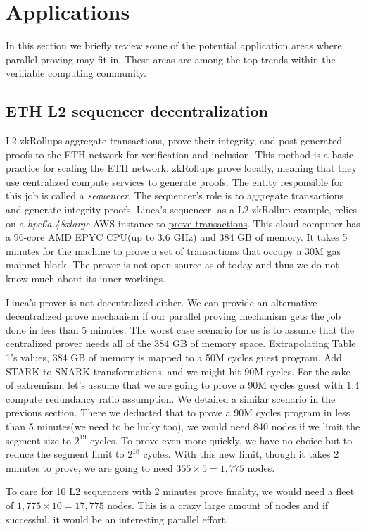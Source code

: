 \documentclass[a4paper, 10pt]{article}
\begin{document}
\section{Applications}
In this section we briefly review some of the potential application areas where parallel proving may fit in. These areas are among the top trends within the verifiable computing community.

\subsection{ETH L2 sequencer decentralization}
L2 zkRollups aggregate transactions, prove their integrity, and post generated proofs to the ETH network for verification and inclusion. This method is a basic practice for scaling the ETH network. zkRollups prove locally, meaning that they use centralized compute services to generate proofs. The entity responsible for this job is called a \textit{sequencer}. The sequencer's role is to aggregate transactions and generate integrity proofs. Linea's sequencer, as a L2 zkRollup example, relies on a \textit{hpc6a.48xlarge} AWS instance to \href{https://ethresear.ch/t/vortex-building-a-prover-for-the-zk-evm/14427}{prove transactions}. This cloud computer has a 96-core AMD EPYC CPU(up to 3.6 GHz) and 384 GB of memory. It takes \underline{5 minutes} for the machine to prove a set of transactions that occupy a 30M gas mainnet block. The prover is not open-source as of today and thus we do not know much about its inner workings.
\par
Linea's prover is not decentralized either. We can provide an alternative decentralized prove mechanism if our parallel proving mechanism gets the job done in less than 5 minutes. The worst case scenario for us is to assume that the centralized prover needs all of the 384 GB of memory space. Extrapolating Table 1's values, 384 GB of memory is mapped to a 50M cycles guest program. Add STARK to SNARK transformations, and we might hit 90M cycles. For the sake of extremism, let's assume that we are going to prove a 90M cycles guest with 1:4 compute redundancy ratio assumption. We detailed a similar scenario in the previous section. There we deducted that to prove a 90M cycles program in less than 5 minutes(we need to be lucky too), we would need 840 nodes if we limit the segment size to $2^{19}$ cycles. To prove even more quickly, we have no choice but to reduce the segment limit to $2^{18}$ cycles. With this new limit, though it takes 2 minutes to prove, we are going to need $355 \times 5 = 1,775$ nodes.
\par
To care for 10 L2 sequencers with 2 minutes prove finality, we would need a fleet of $1,775 \times 10 = 17,775$ nodes. This is a crazy large amount of nodes and if successful, it would be an interesting parallel effort.
\end{document}
